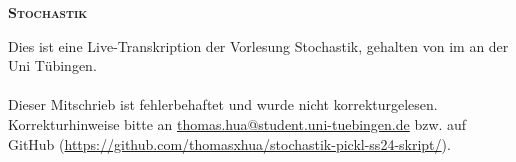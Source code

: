 

\usepackage{hyperref}
\usepackage{url}
\usepackage{tikz}
\usepackage{titlesec}
\usepackage{marvosym}
\newcommand{\pickl}[1]{\begin{center}\hrulefill\ \texttt{[ \textbf{Pickl #1} ]}\ \hrulefill\end{center}}
\newcommand{\PP}{\mathbb{P}}
\renewcommand{\thesection}{\Roman{section}}
\setcounter{tocdepth}{2}
\renewcommand{\contentsname}{Inhaltsverzeichnis}


\begin{center}
    {\huge{\textsc{\textbf{Stochastik}}}}
\end{center}
Dies ist eine Live-Transkription der Vorlesung Stochastik, gehalten von  im  an der Uni T\"ubingen.
\\~\\
Dieser Mitschrieb ist fehlerbehaftet und wurde nicht korrekturgelesen. Korrekturhinweise bitte an \href{mailto:thomas.hua@student.uni-tuebingen.de}{\url{thomas.hua@student.uni-tuebingen.de}} bzw. auf GitHub (\href{https://github.com/thomasxhua/stochastik-pickl-ss24-skript/}{\url{https://github.com/thomasxhua/stochastik-pickl-ss24-skript/}}).
\tableofcontents
\newpage











